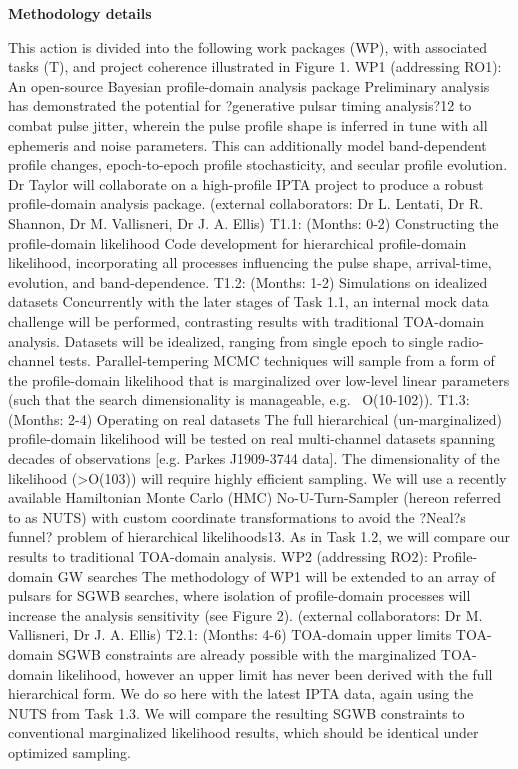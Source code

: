 \documentclass[11pt,letterpaper,sans]{moderncv} %
\begin{document}
\noindent \textbf{Methodology details}

\noindent This action is divided into the following work packages (WP), with associated tasks (T), and project coherence illustrated in Figure 1. 
WP1 (addressing RO1): An open-source Bayesian profile-domain analysis package
Preliminary analysis has demonstrated the potential for ?generative pulsar timing analysis?12 to combat pulse jitter, wherein the pulse profile shape is inferred in tune with all ephemeris and noise parameters. This can additionally model band-dependent profile changes, epoch-to-epoch profile stochasticity, and secular profile evolution. Dr Taylor will collaborate on a high-profile IPTA project to produce a robust profile-domain analysis package. (external collaborators: Dr L. Lentati, Dr R. Shannon, Dr M. Vallisneri, Dr J. A. Ellis)
T1.1: (Months: 0-2) Constructing the profile-domain likelihood 
Code development for hierarchical profile-domain likelihood, incorporating all processes influencing the pulse shape, arrival-time, evolution, and band-dependence. 
T1.2: (Months: 1-2) Simulations on idealized datasets 
Concurrently with the later stages of Task 1.1, an internal mock data challenge will be performed, contrasting results with traditional TOA-domain analysis. Datasets will be idealized, ranging from single epoch to single radio-channel tests. Parallel-tempering MCMC techniques will sample from a form of the profile-domain likelihood that is marginalized over low-level linear parameters (such that the search dimensionality is manageable, e.g. ~O(10-102)).
T1.3: (Months: 2-4) Operating on real datasets 
The full hierarchical (un-marginalized) profile-domain likelihood will be tested on real multi-channel datasets spanning decades of observations [e.g. Parkes J1909-3744 data]. The dimensionality of the likelihood (>O(103)) will require highly efficient sampling. We will use a recently available Hamiltonian Monte Carlo (HMC) No-U-Turn-Sampler (hereon referred to as NUTS) with custom coordinate transformations to avoid the ?Neal?s funnel? problem of hierarchical likelihoods13. As in Task 1.2, we will compare our results to traditional TOA-domain analysis.
WP2 (addressing RO2): Profile-domain GW searches
The methodology of WP1 will be extended to an array of pulsars for SGWB searches, where isolation of profile-domain processes will increase the analysis sensitivity (see Figure 2). (external collaborators: Dr M. Vallisneri, Dr J. A. Ellis)
	T2.1: (Months: 4-6) TOA-domain upper limits
	TOA-domain SGWB constraints are already possible with the marginalized TOA-domain likelihood, however an upper limit has never been derived with the full hierarchical form. We do so here with the latest IPTA data, again using the NUTS from Task 1.3. We will compare the resulting SGWB constraints to conventional marginalized likelihood results, which should be identical under optimized sampling.
\end{document}

